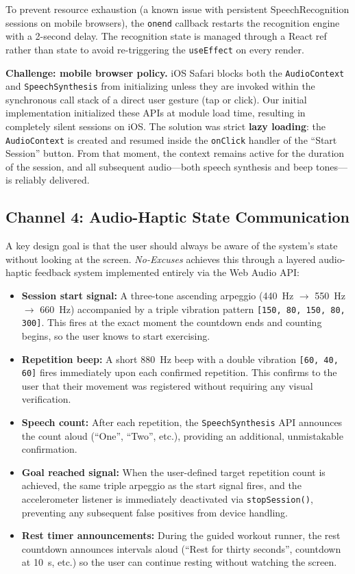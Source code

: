 \documentclass[11pt]{article}
\begin{document}
To prevent resource exhaustion (a known issue with persistent SpeechRecognition sessions on mobile browsers), the \texttt{onend} callback restarts the recognition engine with a 2-second delay. The recognition state is managed through a React ref rather than state to avoid re-triggering the \texttt{useEffect} on every render.

\textbf{Challenge: mobile browser policy.} iOS Safari blocks both the \texttt{AudioContext} and \texttt{SpeechSynthesis} from initializing unless they are invoked within the synchronous call stack of a direct user gesture (tap or click). Our initial implementation initialized these APIs at module load time, resulting in completely silent sessions on iOS. The solution was strict \textbf{lazy loading}: the \texttt{AudioContext} is created and resumed inside the \texttt{onClick} handler of the ``Start Session'' button. From that moment, the context remains active for the duration of the session, and all subsequent audio—both speech synthesis and beep tones—is reliably delivered.

\subsection{Channel 4: Audio-Haptic State Communication}

A key design goal is that the user should always be aware of the system's state without looking at the screen. \textit{No-Excuses} achieves this through a layered audio-haptic feedback system implemented entirely via the Web Audio API:

\begin{itemize}
  \item \textbf{Session start signal:} A three-tone ascending arpeggio (440~Hz $\to$ 550~Hz $\to$ 660~Hz) accompanied by a triple vibration pattern \texttt{[150, 80, 150, 80, 300]}. This fires at the exact moment the countdown ends and counting begins, so the user knows to start exercising.
  \item \textbf{Repetition beep:} A short 880~Hz beep with a double vibration \texttt{[60, 40, 60]} fires immediately upon each confirmed repetition. This confirms to the user that their movement was registered without requiring any visual verification.
  \item \textbf{Speech count:} After each repetition, the \texttt{SpeechSynthesis} API announces the count aloud (``One'', ``Two'', etc.), providing an additional, unmistakable confirmation.
  \item \textbf{Goal reached signal:} When the user-defined target repetition count is achieved, the same triple arpeggio as the start signal fires, and the accelerometer listener is immediately deactivated via \texttt{stopSession()}, preventing any subsequent false positives from device handling.
  \item \textbf{Rest timer announcements:} During the guided workout runner, the rest countdown announces intervals aloud (``Rest for thirty seconds'', countdown at 10~s, etc.) so the user can continue resting without watching the screen.
\end{itemize}
\end{document}
